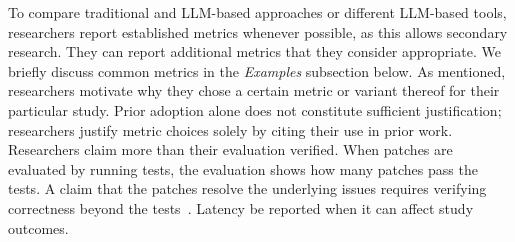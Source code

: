 To compare traditional and LLM-based approaches or different LLM-based tools, researchers \should report established metrics whenever possible, as this allows secondary research.
They can report additional metrics that they consider appropriate.
We briefly discuss common metrics in the \emph{Examples} subsection below.
As mentioned, researchers \must motivate why they chose a certain metric or variant thereof for their particular study.
Prior adoption alone does not constitute sufficient justification; researchers \mustnot justify metric choices solely by citing their use in prior work.
Researchers \mustnot claim more than their evaluation verified. When patches are evaluated by running tests, the evaluation shows how many patches pass the tests. A claim that the patches resolve the underlying issues requires verifying correctness beyond the tests~\cite{Izadi2026benchmarking}.
Latency \must be reported when it can affect study outcomes.

